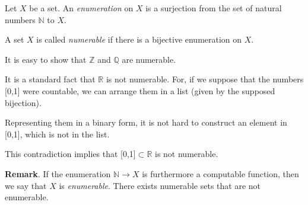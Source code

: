 \documentclass[12pt]{article}
\begin{document}
Let $X$ be a set.  An \emph{enumeration} on $X$ is a surjection from the set of natural numbers $\mathbb{N}$ to $X$.

A set $X$ is called \emph{numerable} if there is a bijective enumeration on $X$.

It is easy to show that $\mathbb{Z}$ and $\mathbb{Q}$ are numerable.

It is a standard fact that $\mathbb{R}$ is not numerable. For, if we suppose that the numbers [0,1] were countable, we can arrange them in a list (given by the supposed bijection).

Representing them in a binary form, it is not hard to construct an element in [0,1], which is not in the list.

This contradiction implies that [0,1]$\subset\mathbb{R}$ is not numerable. 

\textbf{Remark}.  If the enumeration $\mathbb{N}\to X$ is furthermore a computable function, then we say that $X$ is \emph{enumerable}.  There exists numerable sets that are not enumerable.
\end{document}

